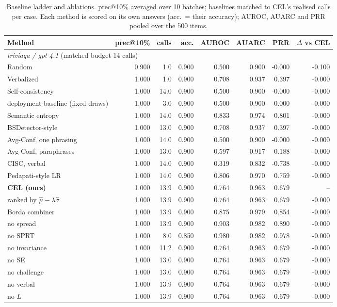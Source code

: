 \begin{table}[t]
\centering
\small
\begin{tabular}{lrrrrrrr}
\toprule
Method & prec@10\% & calls & acc. & AUROC & AUARC & PRR & $\Delta$ vs CEL \\
\midrule
\multicolumn{8}{l}{\emph{triviaqa / gpt-4.1} (matched budget 14 calls)} \\
Random & 0.900 & 1.0 & 0.900 & 0.500 & 0.900 & -0.000 & -0.100 \\
Verbalized & 1.000 & 1.0 & 0.900 & 0.708 & 0.937 & 0.397 & -0.000 \\
Self-consistency & 1.000 & 14.0 & 0.900 & 0.500 & 0.900 & -0.000 & -0.000 \\
\quad deployment baseline (fixed draws) & 1.000 & 3.0 & 0.900 & 0.500 & 0.900 & -0.000 & -0.000 \\
Semantic entropy & 1.000 & 14.0 & 0.900 & 0.833 & 0.974 & 0.801 & -0.000 \\
BSDetector-style & 1.000 & 13.0 & 0.900 & 0.708 & 0.937 & 0.397 & -0.000 \\
Avg-Conf, one phrasing \citep{xiong2023} & 1.000 & 14.0 & 0.900 & 0.500 & 0.900 & -0.000 & -0.000 \\
Avg-Conf, paraphrases \citep{xiong2023} & 1.000 & 13.0 & 0.900 & 0.597 & 0.917 & 0.188 & -0.000 \\
CISC, verbal \citep{taubenfeld2025} & 1.000 & 14.0 & 0.900 & 0.319 & 0.832 & -0.738 & -0.000 \\
Pedapati-style LR \citep{pedapati2024} & 1.000 & 14.0 & 0.900 & 0.806 & 0.970 & 0.759 & -0.000 \\
\textbf{CEL (ours)} & 1.000 & 13.9 & 0.900 & 0.764 & 0.963 & 0.679 & -- \\
\quad ranked by $\hat\mu - \lambda\hat\sigma$ & 1.000 & 13.9 & 0.900 & 0.764 & 0.963 & 0.679 & -0.000 \\
\quad Borda combiner & 1.000 & 13.9 & 0.900 & 0.875 & 0.979 & 0.854 & -0.000 \\
\quad no spread & 1.000 & 13.9 & 0.900 & 0.903 & 0.982 & 0.890 & -0.000 \\
\quad no SPRT & 1.000 & 8.0 & 0.850 & 0.980 & 0.982 & 0.978 & -0.000 \\
\quad no invariance & 1.000 & 11.2 & 0.900 & 0.764 & 0.963 & 0.679 & -0.000 \\
\quad no SE & 1.000 & 13.0 & 0.900 & 0.764 & 0.963 & 0.679 & -0.000 \\
\quad no challenge & 1.000 & 13.0 & 0.900 & 0.764 & 0.963 & 0.679 & -0.000 \\
\quad no verbal & 1.000 & 13.9 & 0.900 & 0.764 & 0.963 & 0.679 & -0.000 \\
\quad no $L$ & 1.000 & 13.9 & 0.900 & 0.764 & 0.963 & 0.679 & -0.000 \\
\bottomrule
\end{tabular}
\caption{Baseline ladder and ablations. prec@10\% averaged over 10 batches; baselines matched to CEL's realised calls per case. Each method is scored on its own answers (acc.\ = their accuracy); AUROC, AUARC and PRR pooled over the 500 items.}
\label{tab:main}
\end{table}
